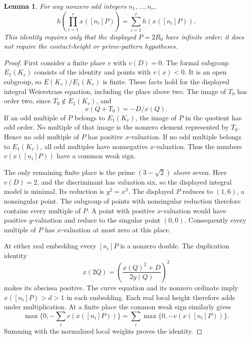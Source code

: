 \documentclass[11pt,a4paper]{article}
\newtheorem{lemma}[theorem]{Lemma}
\theoremstyle{definition}
\theoremstyle{remark}
\begin{document}
\begin{lemma}\label{lem:u29-product}
For any nonzero odd integers $n_1,\ldots,n_r$,
\[
 h\left(\prod_{i=1}^r x([n_i]P)\right)
       =\sum_{i=1}^r h(x([n_i]P)).
\]
This identity requires only that the displayed $P=2R_0$ have infinite
order; it does not require the contact-height or prime-pattern hypotheses.
\end{lemma}
\begin{proof}
First consider a finite place $v$ with $v(D)=0$.  The formal subgroup
$E_1(K_v)$ consists of the identity and points with $v(x)<0$.
It is an open subgroup, so $E(K_v)/E_1(K_v)$ is finite.  These facts
hold for the displayed integral Weierstrass equation, including the
place above two.  The image of $T_0$ has order two, since
$T_0\notin E_1(K_v)$, and
\[
                    x(Q+T_0)=-D/x(Q).
\]
If an odd multiple of $P$ belongs to $E_1(K_v)$, the image of $P$
in the quotient has odd order.  No multiple of that image is the
nonzero element represented by $T_0$.  Hence no odd multiple of $P$
has positive $x$-valuation.  If no odd multiple belongs to $E_1(K_v)$,
all odd multiples have nonnegative $x$-valuation.  Thus the numbers
$v(x([n_i]P))$ have a common weak sign.

The only remaining finite place is the prime $(3-\sqrt2)$ above seven.
Here $v(D)=2$, and the discriminant has valuation six, so the displayed
integral model is minimal.  Its reduction is $y^2=x^3$.
The displayed $P$ reduces to $(1,6)$, a nonsingular point.  The subgroup
of points with nonsingular reduction therefore contains every multiple
of $P$.  A point with positive $x$-valuation would have positive
$y$-valuation and reduce to the singular point $(0,0)$.  Consequently
every multiple of $P$ has $x$-valuation at most zero at this place.

At either real embedding every $[n_i]P$ is a nonzero double.  The
duplication identity
\[
 x(2Q)=\left(\frac{x(Q)^2+D}{2y(Q)}\right)^2
\]
makes its abscissa positive.  The curve equation and its nonzero
ordinate imply $x([n_i]P)>d>1$ in each embedding.  Each real local
height therefore adds under multiplication.  At a finite place the
common weak sign similarly gives
\[
 \max\{0,-\textstyle\sum_i v(x([n_i]P))\}
       =\sum_i\max\{0,-v(x([n_i]P))\}.
\]
Summing with the normalized local weights proves the identity.
\end{proof}
\end{document}
